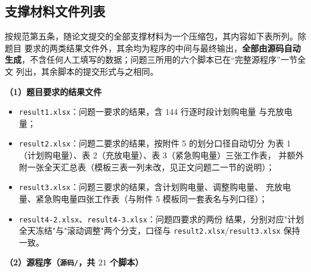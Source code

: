 \documentclass[withoutpreface,bwprint]{cumcmthesis}
\begin{document}
\begin{appendices}
\newpage
\section{支撑材料文件列表}

按规范第五条，随论文提交的全部支撑材料为一个压缩包，其内容如下表所列。除题目
要求的两类结果文件外，其余均为程序的中间与最终输出，\textbf{全部由源码自动
生成}，不含任何人工填写的数据；问题三所用的六个脚本已在“完整源程序”一节全文
列出，其余脚本的提交形式与之相同。

\textbf{（1）题目要求的结果文件}

\begin{itemize}
  \item \texttt{result1.xlsx}：问题一要求的结果，含 $144$ 行逐时段计划购电量
        与充放电量；
  \item \texttt{result2.xlsx}：问题二要求的结果，按附件 5 的划分口径自动切分
        为表 1（计划购电量）、表 2（充放电量）、表 3（紧急购电量）三张工作表，
        并额外附一张全天汇总表（模板三表一列未改，见正文问题二一节的说明）；
  \item \texttt{result3.xlsx}：问题三要求的结果，含计划购电量、调整购电量、
        充放电量、紧急购电量四张工作表（与附件 5 模板同一套表名与列口径）；
  \item \texttt{result4-2.xlsx}、\texttt{result4-3.xlsx}：问题四要求的两份
        结果，分别对应"计划全天冻结"与"滚动调整"两个分支，口径与
        \texttt{result2.xlsx}/\texttt{result3.xlsx} 保持一致。
\end{itemize}

\textbf{（2）源程序（\texttt{源码/}，共 $21$ 个脚本）}


\end{appendices}
\end{document}
